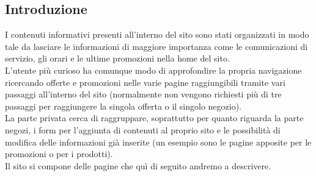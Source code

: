 \documentclass[a4paper,12pt]{article}
\begin{document}
\subsection{Introduzione}
I contenuti informativi presenti all'interno del sito sono stati organizzati in modo tale da lasciare le informazioni di maggiore importanza come le comunicazioni di servizio, gli orari e le ultime promozioni nella home del sito.\\
L'utente più curioso ha comunque modo di approfondire la propria navigazione ricercando offerte e promozioni nelle varie pagine raggiungibili tramite vari passaggi all'interno del sito (normalmente non vengono richiesti più di tre passaggi per raggiungere la singola offerta o il singolo negozio).\\
La parte privata cerca di raggruppare, soprattutto per quanto riguarda la parte negozi, i form per l'aggiunta di contenuti al proprio sito e le possibilità di modifica delle informazioni già inserite (un esempio sono le pagine apposite per le promozioni o per i prodotti).\\
Il sito si compone delle pagine che quì di seguito andremo a descrivere.
\end{document}
